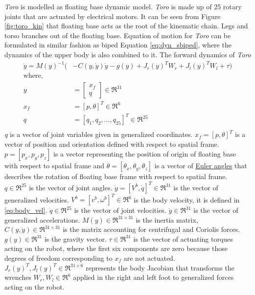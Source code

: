 \emph{Toro} is modelled as floating base dynamic model. \emph{Toro} is made up of 25 rotary joints that are actuated by electrical motors. It can be seen from Figure \ref{fig:toro_kin} that floating base acts as the root of the kinematic chain. Legs and torso branches out of the floating base. Equation of motion for \emph{Toro} can be formulated in similar fashion as biped Equation \ref{eq:dyn_sbiped}, where the dynamics of the upper body is also combined to it. The forward dynamics of \emph{Toro} 
\begin{equation}
	\label{eq:motion}
	\begin{split}
	\ddot{y} = M(y)^{-1}(&-C(y,\dot{y})\dot{y} - g(y) + J_r(y)^{T}W_{r} +J_l(y)^{T}W_{l} + \tau) \\
	\text{where,}\\ y &=
	\begin{bmatrix}
	 x_f \\ q 
	\end{bmatrix} \in \Re ^{31} \\
	x_f &= [p,\theta]^T \in \Re ^6 \\
	q &= [q_{1},q_{2},\ldots , q_{25}]^T \in \Re ^{25}\\
	\end{split}
\end{equation}
\emph{q} is a vector of joint variables given in generalized coordinates. $x_{f}=[p,\theta]^{T}$ is a vector of position and orientation defined with respect to spatial frame. $p=[p_x,p_y,p_z]$ is a vector representing  the position of origin of floating base with respect to spatial frame and $\theta=[\theta_{x},\theta_{y},\theta_{z}]$ is a vector of \underline{Euler angles}  that describes the rotation of floating base frame with respect to spatial frame. $q \in \Re^{25}$ is the vector of joint angles. $\dot{y}=[V^{b},\dot{q}]^T \in \Re^{31}$ is the vector of generalized velocities. $V^b= [v^b,\omega^b]^T \in \Re^{6}$ is the body velocity, it is defined in \ref{eq:body_vel}. $\dot{q} \in \Re^{25}$ is the vector of joint velocities. $\ddot{y}\in \Re^{31}$ is the vector of generalized accelerations. $M(y)\in \Re^{31 \times 31}$ is the inertia matrix, $C(y,\dot{y})\in \Re^{31 \times 31}$ is the matrix accounting for centrifugal and Coriolis forces. $g(y) \in \Re^{31}$ is the gravity vector. $\tau \in \Re^{31}$ is the vector of actuating torques acting on the robot, where the first six components are zero because those degrees of freedom corresponding to $x_f$ are not actuated. $J_r(y)^{T},J_l(y)^{T} \in \Re^{31 \times 6}$ represents the body Jacobian that transforms the wrenches $W_r,W_l \in \Re^{6}$ applied in the right and left foot to generalized forces acting on the robot.

